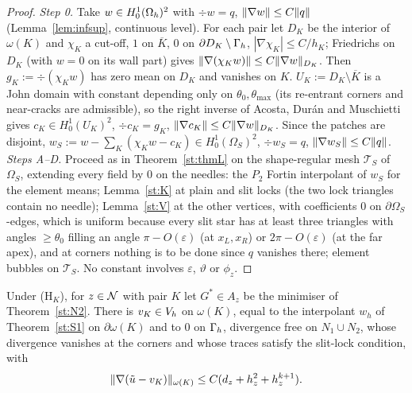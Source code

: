\begin{proof}
\emph{Step 0.} Take $w\in H^1_0(\Omega_h)^2$ with $\div w=q$, $\lVert \nabla w\rVert\le C\lVert q\rVert$ (Lemma~\ref{lem:infsup}, continuous level). For each pair let $D_K$ be the interior of $\omega(K)$ and $\chi_K$ a cut-off, $1$ on $\overline K$, $0$ on $\partial D_K\setminus\Gamma_h$, $|\nabla\chi_K|\le C/h_K$; Friedrichs on $D_K$ (with $w=0$ on its wall part) gives $\lVert \nabla(\chi_Kw)\rVert\le C\lVert \nabla w\rVert_{D_K}$. Then $g_K:=\div(\chi_Kw)$ has zero mean on $D_K$ and vanishes on $K$. $U_K:=D_K\setminus\overline K$ is a John domain with constant depending only on $\theta_0,\theta_{\max}$ (its re-entrant corners and near-cracks are admissible), so the right inverse of Acosta, Dur\'an and Muschietti \cite{AcostaDuranMuschietti2006} gives $c_K\in H^1_0(U_K)^2$, $\div c_K=g_K$, $\lVert \nabla c_K\rVert\le C\lVert \nabla w\rVert_{D_K}$. Since the patches are disjoint, $w_S:=w-\sum_K(\chi_Kw-c_K)\in H^1_0(\Omega_S)^2$, $\div w_S=q$, $\lVert \nabla w_S\rVert\le C\lVert q\rVert$.
\emph{Steps A--D.} Proceed as in Theorem~\ref{st:thmL} on the shape-regular mesh $\mathcal T_S$ of $\Omega_S$, extending every field by $0$ on the needles: the $P_2$ Fortin interpolant of $w_S$ for the element means; Lemma~\ref{st:K} at plain and slit locks (the two lock triangles contain no needle); Lemma~\ref{st:V} at the other vertices, with coefficients $0$ on $\partial\Omega_S$-edges, which is uniform because every slit star has at least three triangles with angles $\ge\theta_0$ filling an angle $\pi-O(\varepsilon)$ (at $x_L,x_R$) or $2\pi-O(\varepsilon)$ (at the far apex), and at corners nothing is to be done since $q$ vanishes there; element bubbles on $\mathcal T_S$. No constant involves $\varepsilon$, $\vartheta$ or $\phi_z$.
\end{proof}

\begin{lemma}\label{st:A}
Under (H$_K$), for $z\in\mathcal N$ with pair $K$ let $G^\ast\in A_z$ be the minimiser of Theorem~\ref{st:N2}. There is $v_K\in V_h$ on $\omega(K)$, equal to the interpolant $w_h$ of Theorem~\ref{st:S1} on $\partial\omega(K)$ and to $0$ on $\Gamma_h$, divergence free on $N_1\cup N_2$, whose divergence vanishes at the corners and whose traces satisfy the slit-lock condition, with
\[
\lVert \nabla(\tilde u-v_K)\rVert_{\omega(K)}\le C(d_z+h_z^2+h_z^{k+1}).
\]
\end{lemma}

